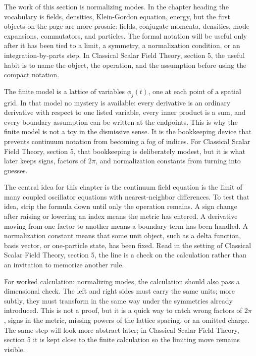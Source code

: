 The work of this section is normalizing modes.  In the chapter heading the vocabulary is fields, densities, Klein-Gordon equation, energy, but the first objects on the page are more prosaic: fields, conjugate momenta, densities, mode expansions, commutators, and particles.  The formal notation will be useful only after it has been tied to a limit, a symmetry, a normalization condition, or an integration-by-parts step.  In Classical Scalar Field Theory, section 5, the useful habit is to name the object, the operation, and the assumption before using the compact notation.

The finite model is a lattice of variables \(\phi_j(t)\), one at each point of a spatial grid.  In that model no mystery is available: every derivative is an ordinary derivative with respect to one listed variable, every inner product is a sum, and every boundary assumption can be written at the endpoints.  This is why the finite model is not a toy in the dismissive sense.  It is the bookkeeping device that prevents continuum notation from becoming a fog of indices.  For Classical Scalar Field Theory, section 5, that bookkeeping is deliberately modest, but it is what later keeps signs, factors of \(2\pi\), and normalization constants from turning into guesses.

The central idea for this chapter is the continuum field equation is the limit of many coupled oscillator equations with nearest-neighbor differences.  To test that idea, strip the formula down until only the operation remains.  A sign change after raising or lowering an index means the metric has entered.  A derivative moving from one factor to another means a boundary term has been handled.  A normalization constant means that some unit object, such as a delta function, basis vector, or one-particle state, has been fixed.  Read in the setting of Classical Scalar Field Theory, section 5, the line is a check on the calculation rather than an invitation to memorize another rule.

For worked calculation: normalizing modes, the calculation should also pass a dimensional check.  The left and right sides must carry the same units; more subtly, they must transform in the same way under the symmetries already introduced.  This is not a proof, but it is a quick way to catch wrong factors of \(2\pi\), signs in the metric, missing powers of the lattice spacing, or an omitted charge.  The same step will look more abstract later; in Classical Scalar Field Theory, section 5 it is kept close to the finite calculation so the limiting move remains visible.


